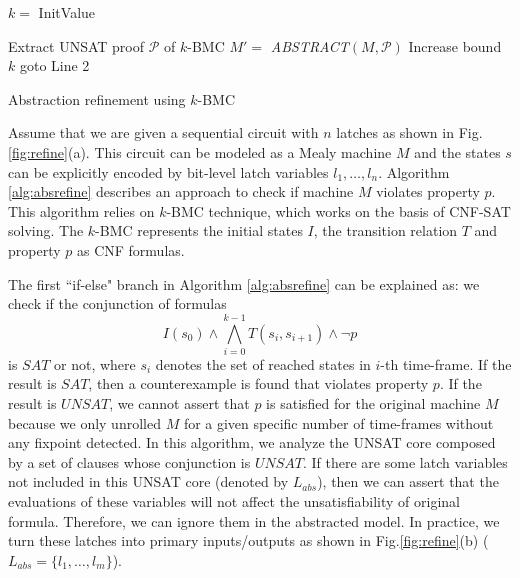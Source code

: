 
\IncMargin{1em}
\begin{algorithm}[H]
\SetAlgoNoLine
\LinesNumbered
  $k = $ InitValue\;
  
  {
  }
  {
	Extract UNSAT proof $\mathcal P$ of $k$-BMC\;
	$M' = $ \textit{ABSTRACT}$(M,\mathcal P)$\;
  }
  {
  }
  {
	Increase bound $k$\;
	goto Line 2\;
  }
\caption {Abstraction refinement using $k$-BMC}\label{alg:absrefine}
\end{algorithm}
\DecMargin{1em}


\begin{figure}[hbt]
\end{figure}
Assume that we are given a sequential circuit with $n$ latches as shown in Fig.\ref{fig:refine}(a). 
This circuit can be modeled as a Mealy machine $M$ and the states $s$ can be explicitly encoded by bit-level latch variables 
$l_1,\dots,l_n$. Algorithm \ref{alg:absrefine} describes an approach to check if machine $M$ violates property $p$.
This algorithm relies on $k$-BMC technique, which works on the basis of CNF-SAT solving.
The $k$-BMC represents the initial states $I$, the transition relation $T$ and property $p$ as CNF formulas.

The first ``if-else" branch in Algorithm \ref{alg:absrefine} can be
explained as: we check if the conjunction of formulas 
$$I(s_0)\land \bigwedge_{i=0}^{k-1}T(s_i,s_{i+1}) \land \neg p$$
is $SAT$ or not, where $s_i$ denotes the set of reached states in $i$-th time-frame. If the result is
$SAT$, then a counterexample is found that violates property $p$. If the result is $UNSAT$, we cannot
assert that $p$ is satisfied for the original machine $M$ because we only unrolled $M$ for a given specific number of time-frames
without any fixpoint detected.
In this algorithm, we analyze the UNSAT core composed by a set of clauses whose conjunction is $UNSAT$.
If there are some latch variables not included in this UNSAT core (denoted by $L_{abs}$), then we can assert that the evaluations of 
these variables will not affect the unsatisfiability of original formula. Therefore, we can ignore them in the abstracted model.
In practice, we turn these latches into primary inputs/outputs as shown in Fig.\ref{fig:refine}(b) ($L_{abs} = \{l_1,\dots,l_m\}$).


